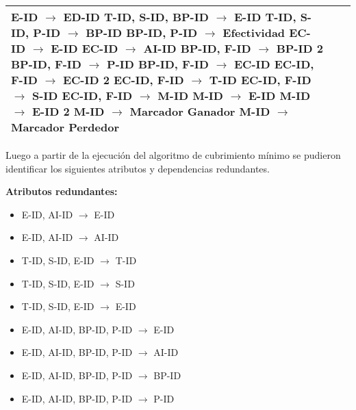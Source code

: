 \documentclass{report}
\begin{document}
\begin{tabularx}{\textwidth}{|X|X|X|}
        E-ID $\rightarrow$ ED-ID \newline 
        T-ID, S-ID, BP-ID $\rightarrow$ E-ID \newline 
        T-ID, S-ID, P-ID $\rightarrow$ BP-ID \newline 
        BP-ID, P-ID $\rightarrow$ Efectividad \newline 
        EC-ID $\rightarrow$ E-ID \newline 
        EC-ID $\rightarrow$ AI-ID \newline 
        BP-ID, F-ID $\rightarrow$ BP-ID 2 \newline 
        BP-ID, F-ID $\rightarrow$ P-ID \newline 
        BP-ID, F-ID $\rightarrow$ EC-ID \newline 
        EC-ID, F-ID $\rightarrow$ EC-ID 2 \newline 
        EC-ID, F-ID $\rightarrow$ T-ID \newline 
        EC-ID, F-ID $\rightarrow$ S-ID \newline 
        EC-ID, F-ID $\rightarrow$ M-ID \newline 
        M-ID $\rightarrow$ E-ID \newline 
        M-ID $\rightarrow$ E-ID 2 \newline 
        M-ID $\rightarrow$ Marcador Ganador \newline 
        M-ID $\rightarrow$ Marcador Perdedor  \\
        \bottomrule
    \end{tabularx}

    \newpage

    Luego a partir de la ejecución del algoritmo de cubrimiento mínimo se pudieron identificar los siguientes atributos y dependencias redundantes. \newline

    \textbf{Atributos redundantes:}
    \begin{itemize}
        \item E-ID,  AI-ID $\rightarrow$ E-ID
        \item E-ID,  AI-ID $\rightarrow$ AI-ID
        \item T-ID,  S-ID,  E-ID $\rightarrow$ T-ID
        \item T-ID,  S-ID,  E-ID $\rightarrow$ S-ID
        \item T-ID,  S-ID,  E-ID $\rightarrow$ E-ID
        \item E-ID,  AI-ID,  BP-ID,  P-ID $\rightarrow$ E-ID
        \item E-ID,  AI-ID,  BP-ID,  P-ID $\rightarrow$ AI-ID
        \item E-ID,  AI-ID,  BP-ID,  P-ID $\rightarrow$ BP-ID
        \item E-ID,  AI-ID,  BP-ID,  P-ID $\rightarrow$ P-ID
    \end{itemize}
   
\end{document}
